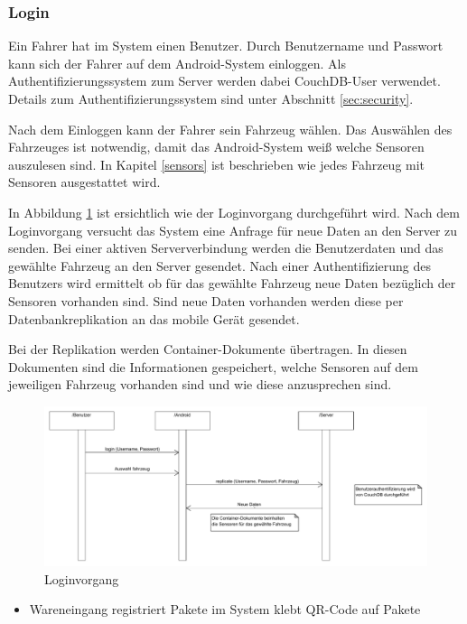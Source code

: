 \begin{appendix}
	\subsubsection{Login}

	Ein Fahrer hat im System einen Benutzer. Durch Benutzername und Passwort kann sich der Fahrer auf dem Android-System einloggen. Als Authentifizierungssystem zum Server werden dabei CouchDB-User verwendet. Details zum Authentifizierungssystem sind unter Abschnitt \ref{sec:security}.

	Nach dem Einloggen kann der Fahrer sein Fahrzeug wählen. Das Auswählen des Fahrzeuges ist notwendig, damit das Android-System weiß welche Sensoren auszulesen sind. In Kapitel \ref{sensors} ist beschrieben wie jedes Fahrzeug mit Sensoren ausgestattet wird. 

	In Abbildung \ref{fig:login} ist ersichtlich wie der Loginvorgang durchgeführt wird. Nach dem Loginvorgang versucht das System eine Anfrage für neue Daten an den Server zu senden.  Bei einer aktiven Serververbindung werden die Benutzerdaten und das gewählte Fahrzeug an den Server gesendet. Nach einer Authentifizierung des Benutzers wird ermittelt ob für das gewählte Fahrzeug neue Daten bezüglich der Sensoren vorhanden sind. Sind neue Daten vorhanden werden diese per Datenbankreplikation an das mobile Gerät gesendet.

	Bei der Replikation werden Container-Dokumente übertragen. In diesen Dokumenten sind die Informationen gespeichert, welche Sensoren auf dem jeweiligen Fahrzeug vorhanden sind und wie diese anzusprechen sind.

	\begin{figure}
		\centering
			\includegraphics[width=\textwidth]{files/pdf/Login.pdf}
		\caption{Loginvorgang}
		\label{fig:login}
	\end{figure}


	\begin{itemize}
	  \item Wareneingang
	  	\subitem registriert Pakete im System
	  	\subitem klebt QR-Code auf Pakete


\end{itemize}
\end{appendix}
